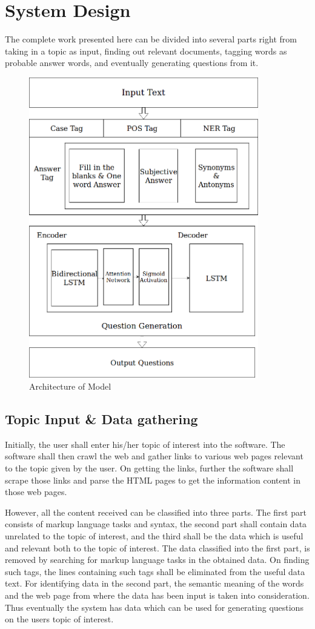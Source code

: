 \chapter{System Design}

The complete work presented here can be divided into several parts right from
taking in a topic as input, finding out relevant documents, tagging words as
probable answer words, and eventually generating questions from it.

\begin{figure}
	\caption{Architecture of Model}
	\centering\includegraphics[width=10cm]{5.png}
\end{figure}

\section{Topic Input \& Data gathering}

Initially, the user shall enter his/her topic of interest into the software. The
software shall then crawl the web and gather links to various web pages relevant
to the topic given by the user. On getting the links, further the software shall
scrape those links and parse the HTML pages to get the information content in
those web pages. 

However, all the content received can be classified into three parts. The first
part consists of markup language tasks and syntax, the second part shall contain
data unrelated to the topic of interest, and the third shall be the data which
is useful and relevant both to the topic of interest. The data classified into
the first part, is removed by searching for markup language tasks in the
obtained data. On finding such tags, the lines containing such tags shall be
eliminated from the useful data text. For identifying data in the second part,
the semantic meaning of the words and the web page from where the data has been
input is taken into consideration. Thus eventually the system has data which can
be used for generating questions on the users topic of interest. 


